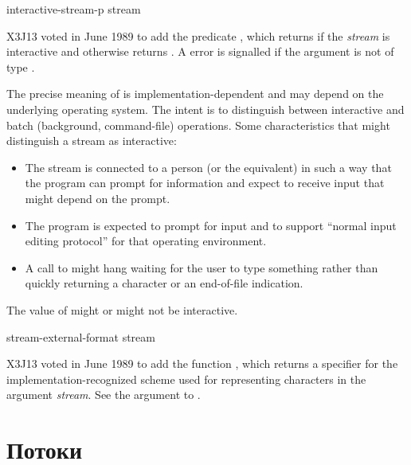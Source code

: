 \begin{newer}
\begin{defun}[Function]
interactive-stream-p stream

X3J13 voted in June 1989  to add the
predicate , which returns 
if the \emph{stream\/} is interactive and otherwise returns .
A  error is signalled if the argument is not of type .

The precise meaning of  is implementation-dependent
and may depend on the underlying operating system.
The intent is to distinguish between interactive and batch (background,
command-file) operations.  Some characteristics that might
distinguish a stream as interactive:
\begin{itemize}
\item The stream is connected to a person (or the equivalent)
in such a way that the program can prompt for information and
expect to receive input that might depend on the prompt.
\item The program is expected to prompt for input and to support
``normal input editing protocol'' for that operating environment.
\item A call to  might hang waiting for the user to type something
rather than quickly returning a character or an end-of-file
indication.
\end{itemize}
The value of  might or might not be interactive.
\end{defun}
\end{newer}

\begin{newer}
\begin{defun}[Function]
stream-external-format stream

X3J13 voted in June 1989  to add the
function , which returns a
specifier for the implementation-recognized scheme used for
representing characters in the argument \emph{stream}.
See the  argument to .
\end{defun}
\end{newer}

\else

\chapter{Потоки}
\label{STREAM}

